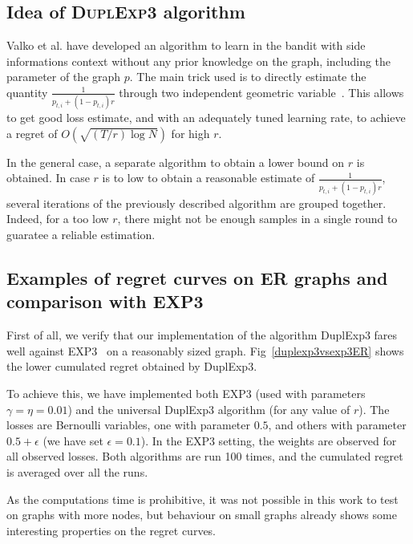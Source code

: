 \documentclass[10pt,a4paper]{scrartcl}
\begin{document}
\subsection{Idea of \textsc{DuplExp3} algorithm}
Valko et al. have developed an algorithm to learn in the bandit with side informations context without any prior knowledge on the graph, including the parameter of the graph $p$. The main trick used is to directly estimate the quantity $\frac{1}{p_{t,i}+(1-p_{t,i})r}$ through two independent geometric variable~\cite{neu2013efficient}. This allows to get good loss estimate, and with an adequately tuned learning rate, to achieve a regret of $O(\sqrt{(T/r)\log N})$ for high $r$.


In the general case, a separate algorithm to obtain a lower bound on $r$ is obtained. In case $r$ is to low to obtain a reasonable estimate of $\frac{1}{p_{t,i}+(1-p_{t,i})r}$, several iterations of the previously described algorithm are grouped together. Indeed, for a too low $r$, there might not be enough samples in a single round to guaratee a reliable estimation. 



\subsection{Examples of regret curves on ER graphs and comparison with EXP3}

First of all, we verify that our implementation of the algorithm DuplExp3 fares well against EXP3~\cite{auer2002nonstochastic} on a reasonably sized graph. Fig~\ref{duplexp3vsexp3ER} shows the lower cumulated regret obtained by DuplExp3.

To achieve this, we have implemented both EXP3 (used with parameters $\gamma=\eta=0.01$) and the universal DuplExp3 algorithm (for any value of $r$). The losses are Bernoulli variables, one with parameter $0.5$, and others with parameter $0.5 + \epsilon$ (we have set $\epsilon = 0.1$). In the EXP3 setting, the weights are observed for all observed losses. Both algorithms are run 100 times, and the cumulated regret is averaged over all the runs.

As the computations time is prohibitive, it was not possible in this work to test on graphs with more nodes, but behaviour on small graphs already shows some interesting properties on the regret curves. 
\end{document}

